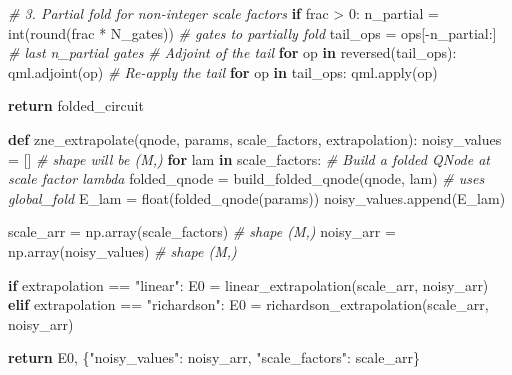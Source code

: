 \documentclass[
  11pt,
]{report}
\newenvironment{Shaded}{}{}
\newcommand{\BuiltInTok}[1]{\textcolor[rgb]{0.00,0.50,0.00}{#1}}
\newcommand{\CommentTok}[1]{\textcolor[rgb]{0.38,0.63,0.69}{\textit{#1}}}
\newcommand{\ControlFlowTok}[1]{\textcolor[rgb]{0.00,0.44,0.13}{\textbf{#1}}}
\newcommand{\DecValTok}[1]{\textcolor[rgb]{0.25,0.63,0.44}{#1}}
\newcommand{\KeywordTok}[1]{\textcolor[rgb]{0.00,0.44,0.13}{\textbf{#1}}}
\newcommand{\NormalTok}[1]{#1}
\newcommand{\OperatorTok}[1]{\textcolor[rgb]{0.40,0.40,0.40}{#1}}
\newcommand{\StringTok}[1]{\textcolor[rgb]{0.25,0.44,0.63}{#1}}
\begin{document}
\begin{Shaded}
\begin{Highlighting}[]
        \CommentTok{\# 3. Partial fold for non{-}integer scale factors}
        \ControlFlowTok{if}\NormalTok{ frac }\OperatorTok{\textgreater{}} \DecValTok{0}\NormalTok{:}
\NormalTok{            n\_partial }\OperatorTok{=} \BuiltInTok{int}\NormalTok{(}\BuiltInTok{round}\NormalTok{(frac }\OperatorTok{*}\NormalTok{ N\_gates))  }\CommentTok{\# gates to partially fold}
\NormalTok{            tail\_ops }\OperatorTok{=}\NormalTok{ ops[}\OperatorTok{{-}}\NormalTok{n\_partial:]              }\CommentTok{\# last n\_partial gates}
            \CommentTok{\# Adjoint of the tail}
            \ControlFlowTok{for}\NormalTok{ op }\KeywordTok{in} \BuiltInTok{reversed}\NormalTok{(tail\_ops):}
\NormalTok{                qml.adjoint(op)}
            \CommentTok{\# Re{-}apply the tail}
            \ControlFlowTok{for}\NormalTok{ op }\KeywordTok{in}\NormalTok{ tail\_ops:}
\NormalTok{                qml.}\BuiltInTok{apply}\NormalTok{(op)}

    \ControlFlowTok{return}\NormalTok{ folded\_circuit}


\KeywordTok{def}\NormalTok{ zne\_extrapolate(qnode, params, scale\_factors, extrapolation):}
\NormalTok{    noisy\_values }\OperatorTok{=}\NormalTok{ []                              }\CommentTok{\# shape will be (M,)}
    \ControlFlowTok{for}\NormalTok{ lam }\KeywordTok{in}\NormalTok{ scale\_factors:}
        \CommentTok{\# Build a folded QNode at scale factor lambda}
\NormalTok{        folded\_qnode }\OperatorTok{=}\NormalTok{ build\_folded\_qnode(qnode, lam)   }\CommentTok{\# uses global\_fold}
\NormalTok{        E\_lam }\OperatorTok{=} \BuiltInTok{float}\NormalTok{(folded\_qnode(params))}
\NormalTok{        noisy\_values.append(E\_lam)}

\NormalTok{    scale\_arr }\OperatorTok{=}\NormalTok{ np.array(scale\_factors)            }\CommentTok{\# shape (M,)}
\NormalTok{    noisy\_arr }\OperatorTok{=}\NormalTok{ np.array(noisy\_values)             }\CommentTok{\# shape (M,)}

    \ControlFlowTok{if}\NormalTok{ extrapolation }\OperatorTok{==} \StringTok{"linear"}\NormalTok{:}
\NormalTok{        E0 }\OperatorTok{=}\NormalTok{ linear\_extrapolation(scale\_arr, noisy\_arr)}
    \ControlFlowTok{elif}\NormalTok{ extrapolation }\OperatorTok{==} \StringTok{"richardson"}\NormalTok{:}
\NormalTok{        E0 }\OperatorTok{=}\NormalTok{ richardson\_extrapolation(scale\_arr, noisy\_arr)}

    \ControlFlowTok{return}\NormalTok{ E0, \{}\StringTok{"noisy\_values"}\NormalTok{: noisy\_arr, }\StringTok{"scale\_factors"}\NormalTok{: scale\_arr\}}



\end{Highlighting}
\end{Shaded}
\end{document}
